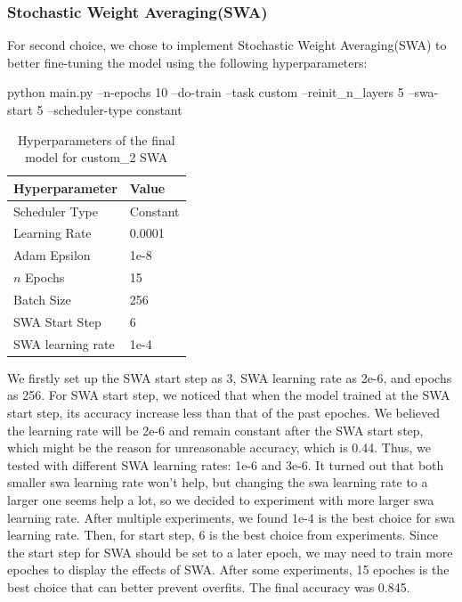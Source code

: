 \documentclass{article}
\begin{document}
    \subsubsection{Stochastic Weight Averaging(SWA)}
    For second choice, we chose to implement Stochastic Weight Averaging(SWA) to better fine-tuning the model using the following hyperparameters:

    python main.py --n-epochs 10 --do-train --task custom --reinit_n_layers 5 --swa-start 5 --scheduler-type constant
    \begin{table}[H]
        \centering
        \begin{tabular}{ll}
            \toprule
            \textbf{Hyperparameter} & \textbf{Value} \\
            \midrule
            Scheduler Type          & Constant       \\
            Learning Rate           & 0.0001         \\
            Adam Epsilon            & 1e-8           \\
            $n$ Epochs              & 15             \\
            Batch Size              & 256            \\
            SWA Start Step          & 6              \\
            SWA learning rate       & 1e-4           \\
            \bottomrule
        \end{tabular}
        \caption{Hyperparameters of the final model for custom_2 SWA}
        \label{tab:hyps_swa}
    \end{table}

    We firstly set up the SWA start step as 3, SWA learning rate as 2e-6, and epochs as 256.
    For SWA start step, we noticed that when the model trained at the SWA start step, its accuracy increase less than that of the past epoches.
    We believed the learning rate will be 2e-6 and remain constant after the SWA start step, which might be the reason for unreasonable accuracy, which is 0.44.
    Thus, we tested with different SWA learning rates: 1e-6 and 3e-6.
    It turned out that both smaller swa learning rate won't help, but changing the swa learning rate to a larger one seems help a lot, so we decided to experiment with more larger swa learning rate.
    After multiple experiments, we found 1e-4 is the best choice for swa learning rate.
    Then, for start step, 6 is the best choice from experiments.
    Since the start step for SWA should be set to a later epoch, we may need to train more epoches to display the effects of SWA.
    After some experiments, 15 epoches is the best choice that can better prevent overfits.
    The final accuracy was 0.845.
\end{document}
